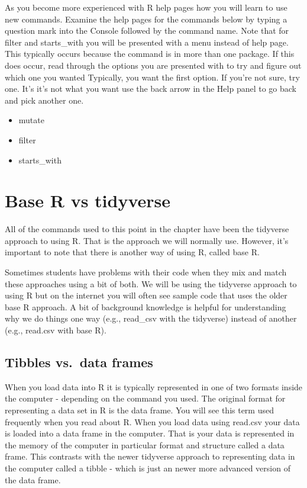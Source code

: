 \documentclass[
]{krantz}
\providecommand{\tightlist}{%
  \setlength{\itemsep}{0pt}\setlength{\parskip}{0pt}}
\begin{document}
As you become more experienced with R help pages how you will learn to use new commands. Examine the help pages for the commands below by typing a question mark into the Console followed by the command name. Note that for filter and starts\_with you will be presented with a menu instead of help page. This typically occurs because the command is in more than one package. If this does occur, read through the options you are presented with to try and figure out which one you wanted Typically, you want the first option. If you're not sure, try one. It's it's not what you want use the back arrow in the Help panel to go back and pick another one.

\begin{itemize}
\tightlist
\item
  mutate
\item
  filter
\item
  starts\_with
\end{itemize}

\hypertarget{base-r-vs-tidyverse}{%
\section{Base R vs tidyverse}\label{base-r-vs-tidyverse}}

All of the commands used to this point in the chapter have been the tidyverse approach to using R. That is the approach we will normally use. However, it's important to note that there is another way of using R, called base R.

Sometimes students have problems with their code when they mix and match these approaches using a bit of both. We will be using the tidyverse approach to using R but on the internet you will often see sample code that uses the older base R approach. A bit of background knowledge is helpful for understanding why we do things one way (e.g., read\_csv with the tidyverse) instead of another (e.g., read.csv with base R).

\hypertarget{tibbles-vs.-data-frames}{%
\subsection{Tibbles vs.~data frames}\label{tibbles-vs.-data-frames}}

When you load data into R it is typically represented in one of two formats inside the computer - depending on the command you used. The original format for representing a data set in R is the data frame. You will see this term used frequently when you read about R. When you load data using read.csv your data is loaded into a data frame in the computer. That is your data is represented in the memory of the computer in particular format and structure called a data frame. This contrasts with the newer tidyverse approach to representing data in the computer called a tibble - which is just an newer more advanced version of the data frame.
\end{document}
